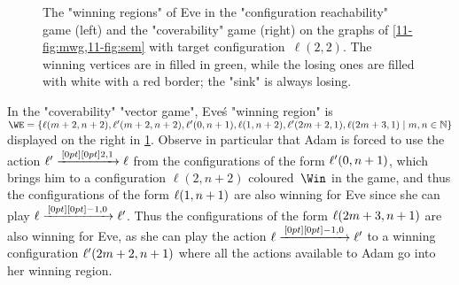 \begin{example}[Objectives]
\begin{figure}[htbp]
{}
  \caption{The "winning regions" of Eve in the
    "configuration reachability" game (left) and the "coverability" game
    (right) on the graphs of \cref{11-fig:mwg,11-fig:sem} with target
    configuration~$\ell(2,2)$.  The winning vertices are in filled in
    green, while the losing ones are filled with white with a red
    border; the "sink" is always losing.}\label{11-fig:cov}
\end{figure}

In the "coverability" "vector game", Eve\'s "winning region" is
$\WE=\{\loc(m+2,n+2),\loc'(m+2,n+2),\loc'(0,n+1),\loc(1,n+2),\loc'(2m+2,1),\loc(2m+3,1)\mid
m,n\in\+N\}$
displayed on the right in \cref{11-fig:cov}.  Observe in particular
that Adam is forced to use the action $\ell'\xrightarrow{\,[0pt][0pt]{\scriptsize{2,1}}\,}\ell$ from
the configurations of the form $\ell'(0,n+1)$, which brings him to a
configuration $\ell(2,n+2)$ coloured~$\Win$ in the game, and thus the
configurations of the form $\ell(1,n+1)$ are also winning for Eve 
since she can play $\ell\xrightarrow{\,[0pt][0pt]{\scriptsize{-1,0}}\,}\ell'$.  Thus the configurations of
the form $\ell(2m+3,n+1)$ are also winning for Eve, as she can play
the action $\ell\xrightarrow{\,[0pt][0pt]{\scriptsize{-1,0}}\,}\ell'$ to a winning configuration
$\ell'(2m+2,n+1)$ where all the actions available to Adam go into
her winning region.
\end{example}

